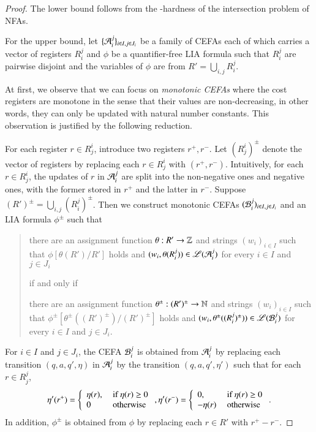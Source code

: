 \begin{proof}
	The lower bound follows from the {\pspace}-hardness of the intersection problem of NFAs. 
	
	For the upper bound, let $\{ \mathcal{A}_i^{j} \}_{i\in I,j\in J_i}$ be a family of CEFAs  each of which carries a vector of registers $R_i^j$ and  $\phi$ be a quantifier-free LIA formula such that  $ R_i^{j} $ are pairwise disjoint and the variables of $\phi$ are from $R'=\bigcup_{i,j} R_i^j$. 
	
	At first, we observe that we can focus on \emph{monotonic CEFAs} where the cost registers are monotone in the sense that their values are non-decreasing, in other words, they can only be updated with natural number constants. This observation is justified by the following reduction.
	
	For each register $r \in R^i_j$, introduce two registers $r^+, r^-$. Let $(R^i_j)^{\pm}$ denote the vector of registers by replacing each $r \in R^i_j$ with $(r^+, r^-)$. Intuitively,  for each $r \in R^i_j$, the updates of $r$ in $\mathcal{A}_i^{j} $ are split into the non-negative ones and negative ones, with the former stored in $r^+$ and the latter in $r^-$. Suppose $(R')^{\pm} = \bigcup_{i,j} (R_i^j)^{\pm}$. Then we construct monotonic CEFAs $(\mathcal{B}_i^{j})_{i \in I, j \in J_i}$ and an LIA formula $\phi^\pm$ such that
	\begin{quote}
		there are an assignment function $\theta: R' \rightarrow \mathbb{Z}$ and strings $(w_i)_{i \in I}$ such that  $\phi[\theta(R' )/R']$ holds and $(w_i, \theta(R_i^j)) \in \mathscr{L}(\mathcal{A}_{i}^j)$ for every $i \in I$ and $j \in J_i$ 
		\begin{center} if and only if \end{center}
		there are an assignment function $\theta^\pm: (R')^\pm \rightarrow \mathbb{N}$ and strings $(w_i)_{i \in I}$ such that  $\phi^\pm[\theta^\pm((R')^\pm)/(R')^\pm]$ holds and $(w_i, \theta^\pm((R_i^j)^\pm)) \in \mathscr{L}(\mathcal{B}_{i}^j)$ for every $i \in I$ and $j \in J_i$.
	\end{quote}
	For $i \in I$ and $j \in J_i$, the CEFA $\mathcal{B}_{i}^j$ is obtained from $\mathcal{A}_{i}^j$ by replacing each transition $(q, a, q', \eta)$ in $\mathcal{A}_i^j$ by the transition $(q, a, q', \eta')$ such that for each $r \in R_j^j$, 
	\[
	\eta'(r^+) = \left\{ \begin{array}{l  l}\eta(r), & \mbox{ if } \eta(r) \ge 0 \\ 0 & \mbox{ otherwise} \end{array}\right.,  \eta'(r^-) = \left\{ \begin{array}{l  l} 0, & \mbox{ if } \eta(r) \ge 0 \\ -\eta(r) & \mbox{ otherwise} \end{array}\right..
	\]
	In addition, $\phi^\pm$ is obtained from $\phi$ by replacing each $r \in R'$ with $r^+-r^-$.
	

\end{proof}

